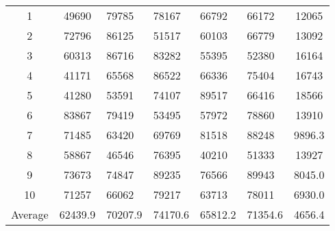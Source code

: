 \begin{table}
\begin{tabular}{| c | c | l | l | l | l | c | }
1	&49690	&79785	&78167	&66792	&66172	&12065\\
2	&72796	&86125	&51517	&60103	&66779	&13092\\
3	&60313	&86716	&83282	&55395	&52380	&16164\\
4	&41171	&65568	&86522	&66336	&75404	&16743\\
5	&41280	&53591	&74107	&89517	&66416	&18566\\
6	&83867	&79419	&53495	&57972	&78860	&13910\\
7	&71485	&63420	&69769	&81518	&88248	&9896.3\\
8	&58867	&46546	&76395	&40210	&51333	&13927\\
9	&73673	&74847	&89235	&76566	&89943	&8045.0\\
10	&71257	&66062	&79217	&63713	&78011	&6930.0\\
Average	&62439.9	&70207.9	&74170.6	&65812.2	&71354.6	&4656.4\\\hline
\end{tabular}
\label{tab:normalised_images}
\end{table}
%